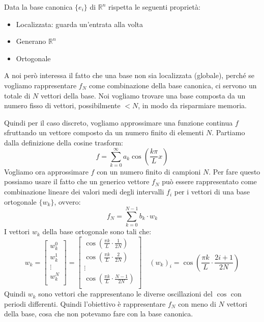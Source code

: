\begin{nota}
    Data la base canonica $\{e_i\}$ di $\mathbb{R}^n$ rispetta le seguenti proprietà:
    \begin{itemize}
        \item Localizzata: guarda un'entrata alla volta
        \item Generano $\mathbb{R}^n$
        \item Ortogonale
    \end{itemize}
\end{nota}

A noi però interessa il fatto che una base non sia localizzata (globale), perché se vogliamo
rappresentare $f_N$ come combinazione della base canonica, ci servono un totale di
$N$ vettori della base. Noi vogliamo trovare una base composta da un numero
fisso di vettori, possibilmente $< N$, in modo da risparmiare memoria.

Quindi per il caso discreto, vogliamo approssimare una funzione continua $f$
sfruttando un vettore composto da un numero finito di elementi $N$. Partiamo dalla
definizione della cosine trasform:
\begin{equation*}
    f= \sum_{k = 0}^{\infty} a_k\cos \left(\frac{k\pi}{L}x\right)
\end{equation*}
Vogliamo ora approssimare $f$ con un numero finito di campioni $N$. Per fare
questo possiamo usare il fatto che un generico vettore $f_N$ può essere rappresentato
come combinazione lineare dei valori medi degli intervalli $f_i$ per i vettori
di una base ortogonale $\{w_k\}$, ovvero:
\begin{equation}
    f_N = \sum_{k=0}^{N-1} b_k \cdot w_k
\end{equation}
I vettori $w_k$ della base ortogonale sono tali che:
\begin{equation*}
    w_k =\left[\begin{array}{c}
            w_k^0  \\
            w_k^1  \\
            \vdots \\
            w_k^N  \\
        \end{array}\right] = \left[\begin{array}{c}
            \cos \left(\frac{\pi k}{L}\cdot \frac{1}{2N}\right)   \\
            \cos \left(\frac{\pi k}{L}\cdot \frac{2}{2N}\right)   \\
            \vdots                                                \\
            \cos \left(\frac{\pi k}{L}\cdot \frac{N-1}{2N}\right) \\
        \end{array}\right]
    \quad (w_k)_i = \cos \left(\frac{\pi k}{L}\cdot \frac{2i+1}{2N}\right)
\end{equation*}
Quindi $w_k$ sono vettori che rappresentano le diverse oscillazioni del $\cos$
con periodi differenti. Quindi l'obiettivo è rappresentare $f_N$ con meno di $N$
vettori della base, cosa che non potevamo fare con la base canonica.

